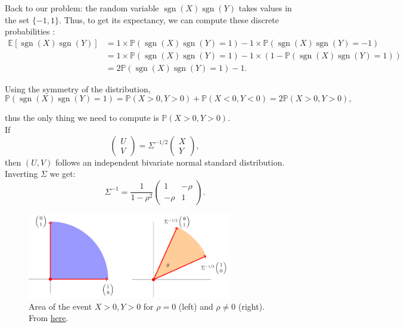 Back to our problem: the random variable $\operatorname{sgn}(X)\operatorname{sgn}(Y)$ takes values in the set $\{-1,1\}$. Thus, to get its expectancy, we can compute these discrete probabilities :
\begin{align*}
    \mathbb{E}[\operatorname{sgn}(X)\operatorname{sgn}(Y)] &= 1\times \mathbb{P}(\operatorname{sgn}(X)\operatorname{sgn}(Y)=1) -1\times \mathbb{P}(\operatorname{sgn}(X)\operatorname{sgn}(Y)=-1)\\
    &= 1\times \mathbb{P}(\operatorname{sgn}(X)\operatorname{sgn}(Y)=1) -1\times (1-\mathbb{P}(\operatorname{sgn}(X)\operatorname{sgn}(Y)=1))\\
    &= 2\mathbb{P}(\operatorname{sgn}(X)\operatorname{sgn}(Y)=1) -1.
\end{align*}

Using the symmetry of the distribution, $$\mathbb{P}(\operatorname{sgn}(X)\operatorname{sgn}(Y)=1) = \mathbb{P}(X>0,Y>0) + \mathbb{P}(X<0,Y<0) = 2\mathbb{P}(X>0,Y>0),$$

thus the only thing we need to compute is $\mathbb{P}(X>0,Y>0)$.\\

If $$\begin{pmatrix}U\\V\end{pmatrix} = \Sigma^{-1/2}\begin{pmatrix}X\\Y\end{pmatrix},$$
then $(U,V)$ follows an independent bivariate normal standard distribution. Inverting $\Sigma$ we get:
$$\Sigma^{-1} = \frac1{1-\rho^2}\begin{pmatrix}
1 & -\rho\\ -\rho & 1
\end{pmatrix}.$$

\begin{figure}[H]
    \centering
    \includegraphics[width=0.8\textwidth]{img/corr_biv_normal.png}
    \caption{Area of the event $X>0,Y>0$ for $\rho = 0$ (left) and $\rho \ne 0$ (right). From \href{https://math.stackexchange.com/questions/1687795/correlated-joint-normal-distribution-calculating-a-probability}{here}.}
\end{figure}

